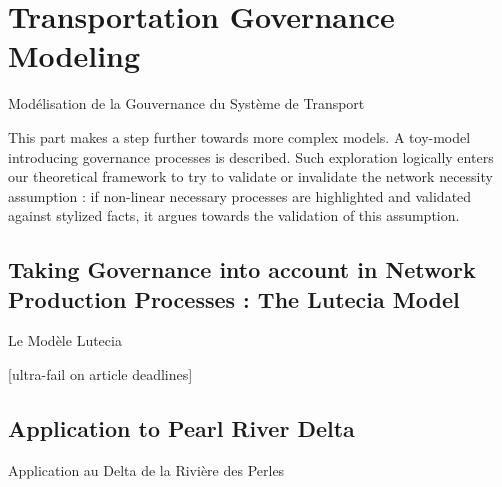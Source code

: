 




\section{Transportation Governance Modeling}{Modélisation de la Gouvernance du Système de Transport} %

\label{sec:lutetia} %



This part makes a step further towards more complex models. A toy-model introducing governance processes is described. Such exploration logically enters our theoretical framework to try to validate or invalidate the network necessity assumption : if non-linear necessary processes are highlighted and validated against stylized facts, it argues towards the validation of this assumption. 






\subsection[The Lutecia Model][Le Modèle Lutecia]{Taking Governance into account in Network Production Processes : The Lutecia Model}{Le Modèle Lutecia}



[ultra-fail on article deadlines]









\subsection[Application][Application]{Application to Pearl River Delta}{Application au Delta de la Rivière des Perles}





